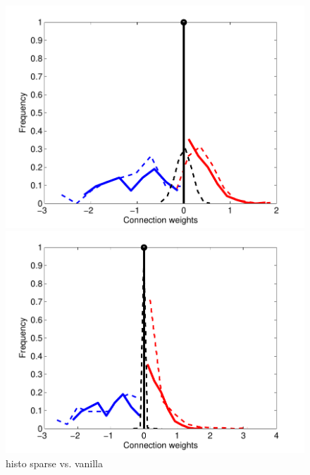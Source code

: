 \begin{figure}[h]
\centering
\begin{minipage}[c]{0.45\hsize}
\includegraphics[width=\hsize]{../figs/Figure5a_hist_glm_vanilla}
\end{minipage}
\begin{minipage}[c]{0.45\hsize}
\includegraphics[width=\hsize]{../figs/Figure5b_hist_glm_sparse}
\end{minipage}
\caption{histo sparse vs. vanilla}
\label{fig:vartau}
\end{figure}



